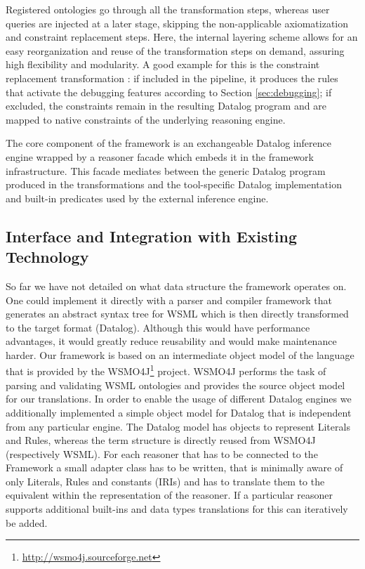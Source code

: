 Registered ontologies go through all the transformation steps,
whereas user queries are injected at a later stage, skipping the
non-applicable axiomatization and constraint replacement steps.
Here, the internal layering scheme allows for an easy
reorganization and reuse of the transformation steps on demand,
assuring high flexibility and modularity. A good example for this
is the constraint replacement transformation \transdebug: if
included in the pipeline, it produces the rules that activate the
debugging features according to Section \ref{sec:debugging}; if
excluded, the constraints remain in the resulting Datalog program
and are mapped to native constraints of the underlying reasoning
engine.

The core component of the framework is an exchangeable Datalog
inference engine wrapped by a reasoner facade which embeds it in
the framework infrastructure. This facade mediates between the
generic Datalog program produced in the transformations and the
tool-specific Datalog implementation and built-in predicates used
by the external inference engine.

\subsection{Interface and Integration with Existing Technology}
So far we have not detailed on what data structure the framework
operates on. One could implement it directly with a parser and
compiler framework that generates an abstract syntax tree for WSML
which is then directly transformed to the target format (Datalog).
Although this would have performance advantages, it would greatly
reduce reusability and would make maintenance harder. Our framework
is based on an intermediate object model of the language that is
provided by the WSMO4J\footnote{\url{http://wsmo4j.sourceforge.net}}
project. WSMO4J performs the task of parsing and validating WSML
ontologies and provides the source object model for our
translations. In order to enable the usage of different Datalog
engines we additionally implemented a simple object model for
Datalog that is independent from any particular engine. The Datalog
model has objects to represent Literals and Rules, whereas the term
structure is directly reused from WSMO4J (respectively WSML). For
each reasoner that has to be connected to the Framework a small
adapter class has to be written, that is minimally aware of only
Literals, Rules and constants (IRIs) and has to translate them to
the equivalent within the representation of the reasoner. If a
particular reasoner supports additional built-ins and data types
translations for this can iteratively be added.

